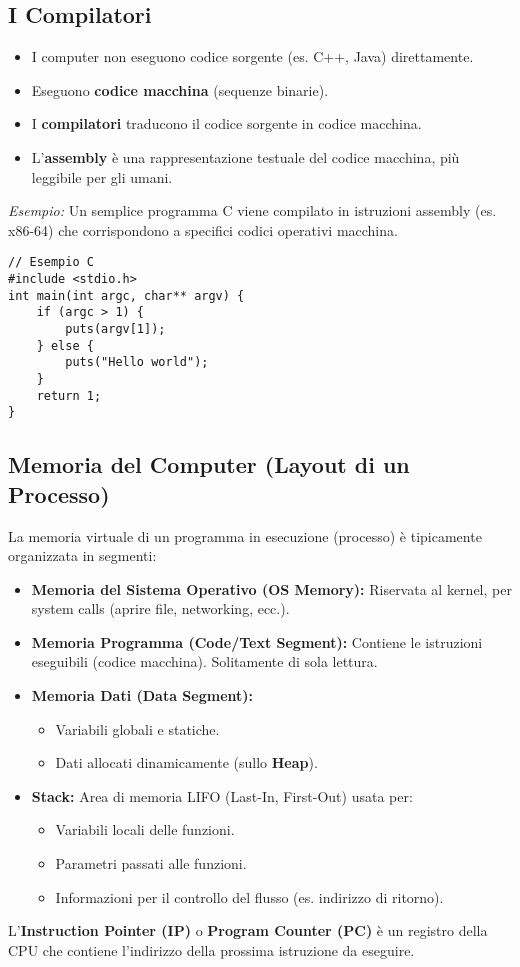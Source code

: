 \subsection{I Compilatori}
\begin{itemize}
    \item I computer non eseguono codice sorgente (es. C++, Java) direttamente.
    \item Eseguono \textbf{codice macchina} (sequenze binarie).
    \item I \textbf{compilatori} traducono il codice sorgente in codice macchina.
    \item L'\textbf{assembly} è una rappresentazione testuale del codice macchina, più leggibile per gli umani.
\end{itemize}
\textit{Esempio:} Un semplice programma C viene compilato in istruzioni assembly (es. x86-64) che corrispondono a specifici codici operativi macchina.

\begin{verbatim}
// Esempio C
#include <stdio.h>
int main(int argc, char** argv) {
    if (argc > 1) {
        puts(argv[1]);
    } else {
        puts("Hello world");
    }
    return 1;
}
\end{verbatim}

\subsection{Memoria del Computer (Layout di un Processo)}
La memoria virtuale di un programma in esecuzione (processo) è tipicamente organizzata in segmenti:
\begin{itemize}
    \item \textbf{Memoria del Sistema Operativo (OS Memory):} Riservata al kernel, per system calls (aprire file, networking, ecc.).
    \item \textbf{Memoria Programma (Code/Text Segment):} Contiene le istruzioni eseguibili (codice macchina). Solitamente di sola lettura.
    \item \textbf{Memoria Dati (Data Segment):}
        \begin{itemize}
            \item Variabili globali e statiche.
            \item Dati allocati dinamicamente (sullo \textbf{Heap}).
        \end{itemize}
    \item \textbf{Stack:} Area di memoria LIFO (Last-In, First-Out) usata per:
        \begin{itemize}
            \item Variabili locali delle funzioni.
            \item Parametri passati alle funzioni.
            \item Informazioni per il controllo del flusso (es. indirizzo di ritorno).
        \end{itemize}
\end{itemize}
L'\textbf{Instruction Pointer (IP)} o \textbf{Program Counter (PC)} è un registro della CPU che contiene l'indirizzo della prossima istruzione da eseguire.

